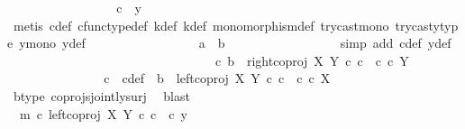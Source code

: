 \begin{isabellebody}
\ \ \ \ \ \ \ \ \ \ \ \ \ \ \isamarkupfalse%
\ \isamarkupfalse%
\ {\isachardoublequoteopen}c\ {\isacharequal}{\kern0pt}\ y{\isachardoublequoteclose}\isanewline
\ \ \ \ \ \ \ \ \ \ \ \ \ \ \ \ \isamarkupfalse%
\ {\isacharparenleft}{\kern0pt}metis\ c{\isacharunderscore}{\kern0pt}def\ cfunc{\isacharunderscore}{\kern0pt}type{\isacharunderscore}{\kern0pt}def\ k{\isacharprime}{\kern0pt}{\isacharunderscore}{\kern0pt}def\ k{\isacharunderscore}{\kern0pt}def\ monomorphism{\isacharunderscore}{\kern0pt}def\ try{\isacharunderscore}{\kern0pt}cast{\isacharunderscore}{\kern0pt}mono\ trycast{\isacharunderscore}{\kern0pt}y{}{\isacharunderscore}{\kern0pt}type\ y{}{\isacharunderscore}{\kern0pt}mono\ y{\isacharunderscore}{\kern0pt}def{\isacharparenright}{\kern0pt}\isanewline
\ \ \ \ \ \ \ \ \ \ \ \ \ \ \isamarkupfalse%
\ \isamarkupfalse%
\ {\isachardoublequoteopen}a\ {\isacharequal}{\kern0pt}\ b{\isachardoublequoteclose}\isanewline
\ \ \ \ \ \ \ \ \ \ \ \ \ \ \ \ \isamarkupfalse%
\ {\isacharparenleft}{\kern0pt}simp\ add{\isacharcolon}{\kern0pt}\ c{\isacharunderscore}{\kern0pt}def\ y{\isacharunderscore}{\kern0pt}def{\isacharparenright}{\kern0pt}\isanewline
\ \ \ \ \ \ \ \ \ \ \isamarkupfalse%
\isanewline
\ \ \ \ \ \ \ \ \isamarkupfalse%
\isanewline
\ \ \ \ \ \ \ \ \ \ \ \ \isamarkupfalse%
\ {\isachardoublequoteopen}{\isasymnexists}c{\isachardot}{\kern0pt}\ b\ {\isacharequal}{\kern0pt}\ right{\isacharunderscore}{\kern0pt}coproj\ X\ Y\ {\isasymcirc}\isactrlsub c\ c\ {\isasymand}\ c\ {\isasymin}\isactrlsub c\ Y{\isachardoublequoteclose}\isanewline
\ \ \ \ \ \ \ \ \ \ \ \ \isamarkupfalse%
\ \isamarkupfalse%
\ c\ \ c{\isacharunderscore}{\kern0pt}def{\isacharcolon}{\kern0pt}\ \ {\isachardoublequoteopen}b\ {\isacharequal}{\kern0pt}\ left{\isacharunderscore}{\kern0pt}coproj\ X\ Y\ {\isasymcirc}\isactrlsub c\ c\ {\isasymand}\ c\ {\isasymin}\isactrlsub c\ X{\isachardoublequoteclose}\isanewline
\ \ \ \ \ \ \ \ \ \ \ \ \ \ \isamarkupfalse%
\ b{\isacharunderscore}{\kern0pt}type\ coprojs{\isacharunderscore}{\kern0pt}jointly{\isacharunderscore}{\kern0pt}surj\ \isamarkupfalse%
\ blast\isanewline
\ \ \ \ \ \ \ \ \ \ \ \ \isamarkupfalse%
\ \isamarkupfalse%
\ \ {\isachardoublequoteopen}m\ {\isasymcirc}\isactrlsub c\ left{\isacharunderscore}{\kern0pt}coproj\ X\ Y\ {\isasymcirc}\isactrlsub c\ c\ {\isacharequal}{\kern0pt}\ {\isasymlangle}c{\isacharcomma}{\kern0pt}\ y{}{\isasymrangle}{\isachardoublequoteclose}\isanewline

\end{isabellebody}
